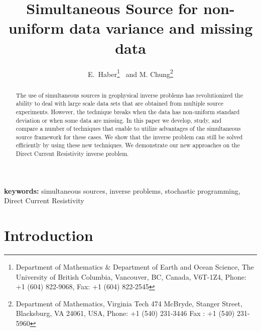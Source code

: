 \documentclass[12pt]{article}
\begin{document}
\title{Simultaneous Source for non-uniform data variance and missing data}

\author{{E.\ Haber\thanks{Department of Mathematics
\& Department of Earth and Ocean Science, The University of British Columbia, Vancouver, BC, Canada, V6T-1Z4,  Phone: +1 (604) 822-9068, Fax: +1 (604) 822-2545}}  \ and {M. Chung\thanks{
Department of Mathematics, Virginia Tech
474 McBryde, Stanger Street, Blacksburg, VA 24061, USA,
Phone: +1 (540) 231-3446     Fax : +1 (540) 231-5960 }}}

\maketitle

\begin{abstract}
The use of simultaneous sources in geophysical inverse problems has revolutionized the ability to deal with large scale data sets that are obtained from multiple source experiments. However, the technique breaks when the data has non-uniform standard deviation or when some data are missing. In this paper we develop, study, and compare a number of techniques that enable to utilize advantages of the simultaneous source framework for these cases. We show that the inverse problem can still be solved efficiently by using these new techniques. We demonstrate our new approaches on the Direct Current Resistivity inverse problem.
\end{abstract}

{\bf keywords:} simultaneous sources, inverse problems, stochastic programming, Direct Current Resistivity\\

\section{Introduction}
\end{document}
